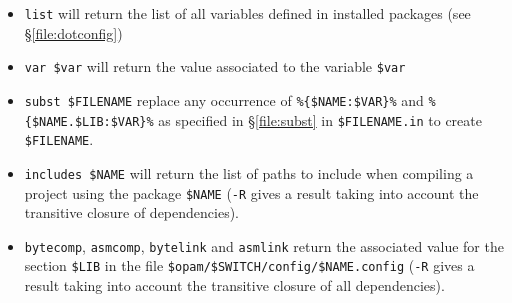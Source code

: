 \documentclass[a4paper,10pt]{article}
\begin{document}
\begin{itemize}
\item \verb+list+ will return the list of all variables defined
  in installed packages (see \S\ref{file:dotconfig})
\item \verb+var $var+ will return the value associated to the
  variable \verb+$var+
\item \label{subst}\verb+subst $FILENAME+ replace any occurrence of
  \verb+%{$NAME:$VAR}%+ and \verb+%{$NAME.$LIB:$VAR}%+ as specified in
  \S\ref{file:subst} in \verb+$FILENAME.in+ to create \verb+$FILENAME+.
\item \verb+includes $NAME+ will return the list of paths to include when
  compiling a project using the package \verb+$NAME+ (\verb+-R+ gives
  a result taking into account the transitive closure of
  dependencies).
\item \verb+bytecomp+, \verb+asmcomp+, \verb+bytelink+ and
  \verb+asmlink+ return the associated value for the section
  \verb+$LIB+ in the file \verb+$opam/$SWITCH/config/$NAME.config+ (\verb+-R+ gives
  a result taking into account the transitive closure of all
  dependencies).
\end{itemize}
\end{document}
